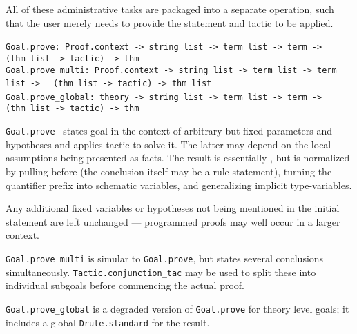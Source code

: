 \begin{isabellebody}
\begin{isamarkuptext}
  All of these administrative tasks are packaged into a separate
  operation, such that the user merely needs to provide the statement
  and tactic to be applied.%
\end{isamarkuptext}%
\isamarkuptrue%
%
\isadelimmlref
%
\endisadelimmlref
%
\isatagmlref
%
\begin{isamarkuptext}%
\begin{mldecls}
  \verb|Goal.prove: Proof.context -> string list -> term list -> term ->|\isasep\isanewline%
\verb|  (thm list -> tactic) -> thm| \\
  \verb|Goal.prove_multi: Proof.context -> string list -> term list -> term list ->|\isasep\isanewline%
\verb|  (thm list -> tactic) -> thm list| \\
  \verb|Goal.prove_global: theory -> string list -> term list -> term ->|\isasep\isanewline%
\verb|  (thm list -> tactic) -> thm| \\
  \end{mldecls}

  \begin{description}

  \item \verb|Goal.prove|~ states goal  in the context of arbitrary-but-fixed parameters 
  and hypotheses  and applies tactic  to
  solve it.  The latter may depend on the local assumptions being
  presented as facts.  The result is essentially , but is normalized by pulling \isa{{\isasymAnd}} before \isa{{\isasymLongrightarrow}}
  (the conclusion  itself may be a rule statement), turning
  the quantifier prefix into schematic variables, and generalizing
  implicit type-variables.

  Any additional fixed variables or hypotheses not being mentioned in
  the initial statement are left unchanged --- programmed proofs may
  well occur in a larger context.

  \item \verb|Goal.prove_multi| is simular to \verb|Goal.prove|, but
  states several conclusions simultaneously.  \verb|Tactic.conjunction_tac| may be used to split these into individual
  subgoals before commencing the actual proof.

  \item \verb|Goal.prove_global| is a degraded version of \verb|Goal.prove| for theory level goals; it includes a global \verb|Drule.standard| for the result.

  \end{description}%
\end{isamarkuptext}%
\isamarkuptrue%
%
\endisatagmlref
{\isafoldmlref}%
%
\isadelimmlref
%
\endisadelimmlref
%
\isadelimtheory
%
\endisadelimtheory
%
\isatagtheory
{}\isamarkupfalse%
%
\endisatagtheory
{\isafoldtheory}%
%
\isadelimtheory
%
\endisadelimtheory
\isanewline
\isanewline
\end{isabellebody}%
